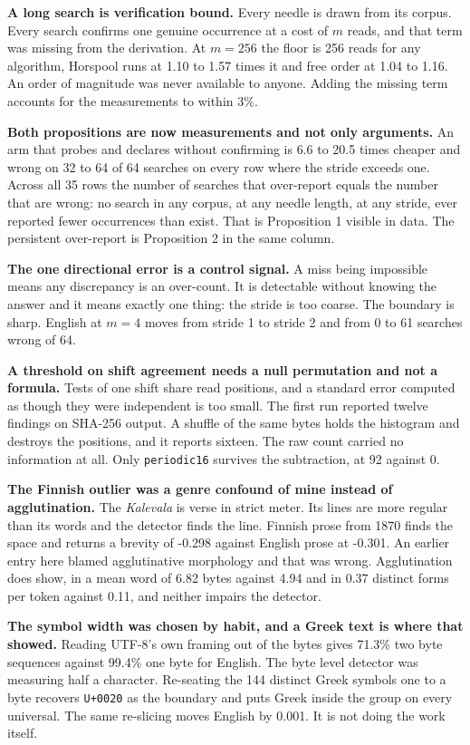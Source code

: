 \textbf{A long search is verification bound.} Every needle is drawn from its corpus. Every search confirms one genuine occurrence at a cost of \(m\) reads, and that term was missing from the derivation. At \(m = 256\) the floor is 256 reads for any algorithm, Horspool runs at 1.10 to 1.57 times it and free order at 1.04 to 1.16. An order of magnitude was never available to anyone. Adding the missing term accounts for the measurements to within 3\%.

\textbf{Both propositions are now measurements and not only arguments.} An arm that probes and declares without confirming is 6.6 to 20.5 times cheaper and wrong on 32 to 64 of 64 searches on every row where the stride exceeds one. Across all 35 rows the number of searches that over-report equals the number that are wrong: no search in any corpus, at any needle length, at any stride, ever reported fewer occurrences than exist. That is Proposition 1 visible in data. The persistent over-report is Proposition 2 in the same column.

\textbf{The one directional error is a control signal.} A miss being impossible means any discrepancy is an over-count. It is detectable without knowing the answer and it means exactly one thing: the stride is too coarse. The boundary is sharp. English at \(m = 4\) moves from stride 1 to stride 2 and from 0 to 61 searches wrong of 64.

\textbf{A threshold on shift agreement needs a null permutation and not a formula.} Tests of one shift share read positions, and a standard error computed as though they were independent is too small. The first run reported twelve findings on SHA-256 output. A shuffle of the same bytes holds the histogram and destroys the positions, and it reports sixteen. The raw count carried no information at all. Only \texttt{periodic16} survives the subtraction, at 92 against 0.

\textbf{The Finnish outlier was a genre confound of mine instead of agglutination.} The \emph{Kalevala} is verse in strict meter. Its lines are more regular than its words and the detector finds the line. Finnish prose from 1870 finds the space and returns a brevity of -0.298 against English prose at -0.301. An earlier entry here blamed agglutinative morphology and that was wrong. Agglutination does show, in a mean word of 6.82 bytes against 4.94 and in 0.37 distinct forms per token against 0.11, and neither impairs the detector.

\textbf{The symbol width was chosen by habit, and a Greek text is where that showed.} Reading UTF-8's own framing out of the bytes gives 71.3\% two byte sequences against 99.4\% one byte for English. The byte level detector was measuring half a character. Re-seating the 144 distinct Greek symbols one to a byte recovers \texttt{U+0020} as the boundary and puts Greek inside the group on every universal. The same re-slicing moves English by 0.001. It is not doing the work itself.

